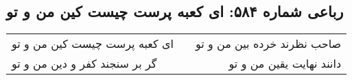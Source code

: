\begin{center}
\section*{رباعی شماره ۵۸۴: ای کعبه پرست چیست کین من و تو}
\label{sec:sh584}
\begin{longtable}{l p{0.5cm} r}
ای کعبه پرست چیست کین من و تو
&&
صاحب نظرند خرده بین من و تو
\\
گر بر سنجند کفر و دین من و تو
&&
دانند نهایت یقین من و تو
\\
\end{longtable}
\end{center}
